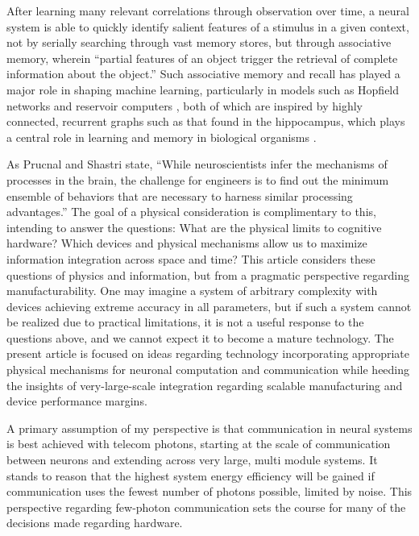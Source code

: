 After learning many relevant correlations through observation over time, a neural system is able to quickly identify salient features of a stimulus in a given context, not by serially searching through vast memory stores, but through associative memory, wherein ``partial features of an object trigger the retrieval of complete information about the object.'' \cite{abps1987} Such associative memory and recall has played a major role in shaping machine learning, particularly in models such as Hopfield networks \cite{ho1982} and reservoir computers \cite{}, both of which are inspired by highly connected, recurrent graphs such as that found in the hippocampus, which plays a central role in learning and memory in biological organisms \cite{}.

\vspace{3em}
As Prucnal and Shastri state, ``While neuroscientists infer the mechanisms of processes in the brain, the challenge for engineers is to find out the minimum ensemble of behaviors that are necessary to harness similar processing advantages.'' The goal of a physical consideration is complimentary to this, intending to answer the questions: What are the physical limits to cognitive hardware? Which devices and physical mechanisms allow us to maximize information integration across space and time? This article considers these questions of physics and information, but from a pragmatic perspective regarding manufacturability. One may imagine a system of arbitrary complexity with devices achieving extreme accuracy in all parameters, but if such a system cannot be realized due to practical limitations, it is not a useful response to the questions above, and we cannot expect it to become a mature technology. The present article is focused on ideas regarding technology incorporating appropriate physical mechanisms for neuronal computation and communication while heeding the insights of very-large-scale integration regarding scalable manufacturing and device performance margins. 

\vspace{3em}
A primary assumption of my perspective is that communication in neural systems is best achieved with telecom photons, starting at the scale of communication between neurons and extending across very large, multi module systems. It stands to reason that the highest system energy efficiency will be gained if communication uses the fewest number of photons possible, limited by noise. This perspective regarding few-photon communication sets the course for many of the decisions made regarding hardware.

